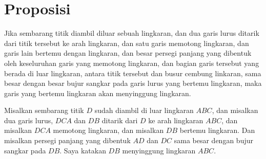 \documentclass[a4paper]{book}
\begin{document}
\section*{\centering Proposisi \thesection}
Jika sembarang titik diambil diluar sebuah lingkaran, dan dua garis lurus
ditarik dari titik tersebut ke arah lingkaran, dan satu garis memotong 
lingkaran, dan garis lain bertemu dengan lingkaran, 
dan besar 
persegi panjang yang dibentuk oleh keseluruhan garis yang memotong 
lingkaran, dan bagian garis tersebut yang berada di luar lingkaran, antara
titik tersebut dan busur cembung linkaran, sama besar dengan besar bujur 
sangkar pada garis lurus yang bertemu lingkaran, maka garis yang bertemu
lingkaran akan menyinggung lingkaran.

\begin{center}
\end{center}

Misalkan sembarang titik $D$ sudah diambil di luar lingkaran $ABC$, dan 
misalkan dua garis lurus, $DCA$ dan $DB$ ditarik dari $D$ ke arah lingkaran
$ABC$, dan misalkan $DCA$ memotong lingkaran, dan misalkan $DB$ bertemu
lingkaran. Dan misalkan persegi panjang yang dibentuk $AD$ dan $DC$ sama
besar dengan bujur sangkar pada $DB$. Saya katakan $DB$ menyinggung 
lingkaran $ABC$.
\end{document}
